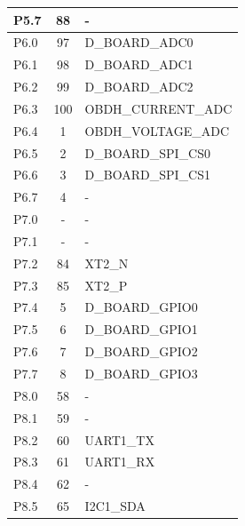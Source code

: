 \begin{table}[!h]
\begin{tabular}{lcl}
        P5.7              & 88                  & -                     \\
        \midrule
        P6.0              & 97                  & D\_BOARD\_ADC0        \\
        P6.1              & 98                  & D\_BOARD\_ADC1        \\
        P6.2              & 99                  & D\_BOARD\_ADC2        \\
        P6.3              & 100                 & OBDH\_CURRENT\_ADC    \\
        P6.4              & 1                   & OBDH\_VOLTAGE\_ADC    \\
        P6.5              & 2                   & D\_BOARD\_SPI\_CS0    \\
        P6.6              & 3                   & D\_BOARD\_SPI\_CS1    \\
        P6.7              & 4                   & -                     \\
        \midrule
        P7.0              & -                   & -                     \\
        P7.1              & -                   & -                     \\
        P7.2              & 84                  & XT2\_N                \\
        P7.3              & 85                  & XT2\_P                \\
        P7.4              & 5                   & D\_BOARD\_GPIO0       \\
        P7.5              & 6                   & D\_BOARD\_GPIO1       \\
        P7.6              & 7                   & D\_BOARD\_GPIO2       \\
        P7.7              & 8                   & D\_BOARD\_GPIO3       \\
        \midrule
        P8.0              & 58                  & -                     \\
        P8.1              & 59                  & -                     \\
        P8.2              & 60                  & UART1\_TX             \\
        P8.3              & 61                  & UART1\_RX             \\
        P8.4              & 62                  & -                     \\
        P8.5              & 65                  & I2C1\_SDA             \\

\end{tabular}
\end{table}
